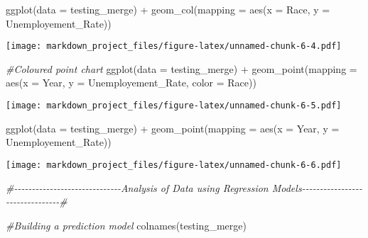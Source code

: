 \documentclass[
]{article}
\newenvironment{Shaded}{\begin{snugshade}}{\end{snugshade}}
\newcommand{\AttributeTok}[1]{\textcolor[rgb]{0.77,0.63,0.00}{#1}}
\newcommand{\CommentTok}[1]{\textcolor[rgb]{0.56,0.35,0.01}{\textit{#1}}}
\newcommand{\FunctionTok}[1]{\textcolor[rgb]{0.00,0.00,0.00}{#1}}
\newcommand{\NormalTok}[1]{#1}
\newcommand{\SpecialCharTok}[1]{\textcolor[rgb]{0.00,0.00,0.00}{#1}}
\begin{document}
\begin{Shaded}
\begin{Highlighting}[]
\FunctionTok{ggplot}\NormalTok{(}\AttributeTok{data =}\NormalTok{ testing\_merge) }\SpecialCharTok{+}
  \FunctionTok{geom\_col}\NormalTok{(}\AttributeTok{mapping =} \FunctionTok{aes}\NormalTok{(}\AttributeTok{x =}\NormalTok{ Race, }\AttributeTok{y =}\NormalTok{ Unemployement\_Rate))}
\end{Highlighting}
\end{Shaded}

\texttt{[image: markdown\_project\_files/figure-latex/unnamed-chunk-6-4.pdf]}

\begin{Shaded}
\begin{Highlighting}[]
\CommentTok{\#Coloured point chart}
\FunctionTok{ggplot}\NormalTok{(}\AttributeTok{data =}\NormalTok{ testing\_merge) }\SpecialCharTok{+}
  \FunctionTok{geom\_point}\NormalTok{(}\AttributeTok{mapping =} \FunctionTok{aes}\NormalTok{(}\AttributeTok{x =}\NormalTok{ Year, }\AttributeTok{y =}\NormalTok{ Unemployement\_Rate, }\AttributeTok{color =}\NormalTok{ Race))}
\end{Highlighting}
\end{Shaded}

\texttt{[image: markdown\_project\_files/figure-latex/unnamed-chunk-6-5.pdf]}

\begin{Shaded}
\begin{Highlighting}[]
\FunctionTok{ggplot}\NormalTok{(}\AttributeTok{data =}\NormalTok{ testing\_merge) }\SpecialCharTok{+}
  \FunctionTok{geom\_point}\NormalTok{(}\AttributeTok{mapping =} \FunctionTok{aes}\NormalTok{(}\AttributeTok{x =}\NormalTok{ Year, }\AttributeTok{y =}\NormalTok{ Unemployement\_Rate))}
\end{Highlighting}
\end{Shaded}

\texttt{[image: markdown\_project\_files/figure-latex/unnamed-chunk-6-6.pdf]}

\begin{Shaded}
\begin{Highlighting}[]
\CommentTok{\#{-}{-}{-}{-}{-}{-}{-}{-}{-}{-}{-}{-}{-}{-}{-}{-}{-}{-}{-}{-}{-}{-}{-}{-}{-}{-}{-}{-}{-}{-}Analysis of Data using Regression Models{-}{-}{-}{-}{-}{-}{-}{-}{-}{-}{-}{-}{-}{-}{-}{-}{-}{-}{-}{-}{-}{-}{-}{-}{-}{-}{-}{-}{-}{-}{-}{-}\#}



\CommentTok{\#Building a prediction model}
\FunctionTok{colnames}\NormalTok{(testing\_merge)}
\end{Highlighting}
\end{Shaded}
\end{document}
